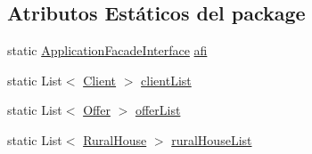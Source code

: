 \subsection*{Atributos Estáticos del \textquotesingle{}package\textquotesingle{}}
\begin{DoxyCompactItemize}
\item 
static \mbox{\hyperlink{interfacecom_1_1ruralhousejsf_1_1business_logic_1_1_application_facade_interface}{Application\+Facade\+Interface}} \mbox{\hyperlink{classcom_1_1ruralhousejsf_1_1_equals_test_a51e738cac64499dfd6d290d8f70ec8ce}{afi}}
\item 
static List$<$ \mbox{\hyperlink{classcom_1_1ruralhousejsf_1_1domain_1_1_client}{Client}} $>$ \mbox{\hyperlink{classcom_1_1ruralhousejsf_1_1_equals_test_a313faa108d9cc5b97c40bf50af089c87}{client\+List}}
\item 
static List$<$ \mbox{\hyperlink{classcom_1_1ruralhousejsf_1_1domain_1_1_offer}{Offer}} $>$ \mbox{\hyperlink{classcom_1_1ruralhousejsf_1_1_equals_test_abf5b3398125f0ed991c84afb429512f4}{offer\+List}}
\item 
static List$<$ \mbox{\hyperlink{classcom_1_1ruralhousejsf_1_1domain_1_1_rural_house}{Rural\+House}} $>$ \mbox{\hyperlink{classcom_1_1ruralhousejsf_1_1_equals_test_a9bdc3ab9b2c103383f6c34f253fe8307}{rural\+House\+List}}
\end{DoxyCompactItemize}
